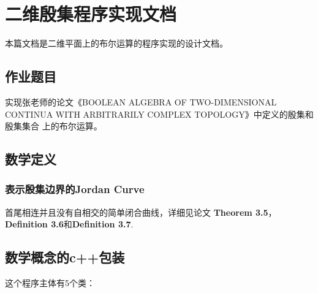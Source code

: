 \documentclass[a4paper]{book}
\makeatletter
\newcommand{\voidenvironment}[1]{%
  \expandafter\providecommand\csname env@#1@save@env\endcsname{}%
  \expandafter\providecommand\csname env@#1@process\endcsname{}%
  \@ifundefined{#1}{}{\RenewEnviron{#1}{}}%
}
\numberwithin{equation}{chapter}
\theoremstyle{definition}
\makeatother
\begin{document}
\pagestyle{empty}

\tableofcontents
\clearpage

\pagestyle{fancy}
\fancyhead{}
\rhead{\today}

\setcounter{chapter}{-1}




\chapter{二维殷集程序实现文档}
本篇文档是二维平面上的布尔运算的程序实现的设计文档。


\section{\heiti 作业题目}
实现张老师的论文《BOOLEAN ALGEBRA OF TWO-DIMENSIONAL CONTINUA
WITH ARBITRARILY COMPLEX TOPOLOGY》中定义的殷集和殷集集合
上的布尔运算。

\section{\heiti 数学定义}
\subsection{表示殷集边界的Jordan Curve}
首尾相连并且没有自相交的简单闭合曲线，详细见论文 \textbf{Theorem 3.5}，
\textbf{Definition 3.6}和\textbf{Definition 3.7}. 




\section{\heiti 数学概念的c++包装}

这个程序主体有5个类：
\end{document}
